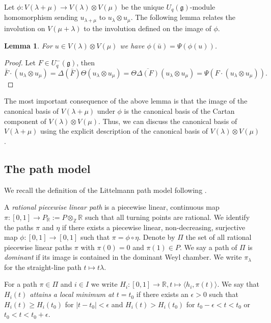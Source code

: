 \documentclass[final]{amsart}
\theoremstyle{plain}
\newtheorem{lemma}[corollary]{Lemma}
\theoremstyle{definition}
\newcommand{\bbR}{\mathbb R}
\newcommand{\bbZ}{\mathbb Z}
\newcommand{\frakg}{\mathfrak g}
\begin{document}
Let $\phi\colon V(\lambda + \mu) \to V(\lambda) \otimes V(\mu)$ be the unique $U_q(\frakg)$-module homomorphism sending $u_{\lambda+\mu}$ to $u_\lambda \otimes u_\mu$.
The following lemma relates the involution on $V(\mu + \lambda)$ to the involution defined on the image of $\phi$.

\begin{lemma}
    For $u\in V(\lambda) \otimes V(\mu)$ we have $\phi(\bar u) = \Psi(\phi(u))$.
\end{lemma}
\begin{proof}
    Let $F\in U_q^-(\frakg)$, then
    \[
        \bar{F} \cdot (u_\lambda \otimes u_\mu) = \Delta(\bar F)\Theta(u_\lambda \otimes u_\mu) = \Theta \overline{\Delta(F)} (u_\lambda\otimes u_\mu) = \Psi(F \cdot (u_\lambda\otimes u_\mu)).
    \]
\end{proof}

The most important consequence of the above lemma is that the image of the canonical basis of $V(\lambda + \mu)$ under $\phi$ is the canonical basis of the Cartan component of $V(\lambda) \otimes V(\mu)$.
Thus, we can discuss the canonical basis of $V(\lambda + \mu)$ using the explicit description of the canonical basis of $V(\lambda) \otimes V(\mu)$.

\subsection{The path model}
\label{section:path-model}

We recall the definition of the Littelmann path model following \cite{Littelmann:Paths-RootOperators-RepresentationTheory}.

A \emph{rational piecewise linear path} is a piecewise linear, continuous map $\pi\colon [0, 1] \to P_\bbR := P \otimes_\bbZ \bbR$ such that all turning points are rational.
We identify the paths $\pi$ and $\eta$ if there exists a piecewise linear, non-decreasing, surjective map $\phi\colon [0, 1] \to [0, 1]$ such that $\pi = \phi \circ \eta$.
Denote by $\Pi$ the set of all rational piecewise linear paths $\pi$ with $\pi(0) = 0$ and $\pi(1)\in P$.
We say a path of $\Pi$ is \emph{dominant} if its image is contained in the dominant Weyl chamber.
We write $\pi_\lambda$ for the straight-line path $t \mapsto t\lambda$.

For a path $\pi \in \Pi$ and $i\in I$ we write $H_i\colon [0,1] \to \bbR, t \mapsto \langle h_i, \pi(t)\rangle$.
We say that \emph{$H_i(t)$ attains a local minimum at $t = t_0$} if there exists an $\epsilon > 0$ such that $H_i(t) \ge H_i(t_0)$ for $|t - t_0| < \epsilon$ and $H_i(t) > H_i(t_0)$ for $t_0-\epsilon < t < t_0$ or $t_0 < t < t_0+\epsilon$.
\end{document}
